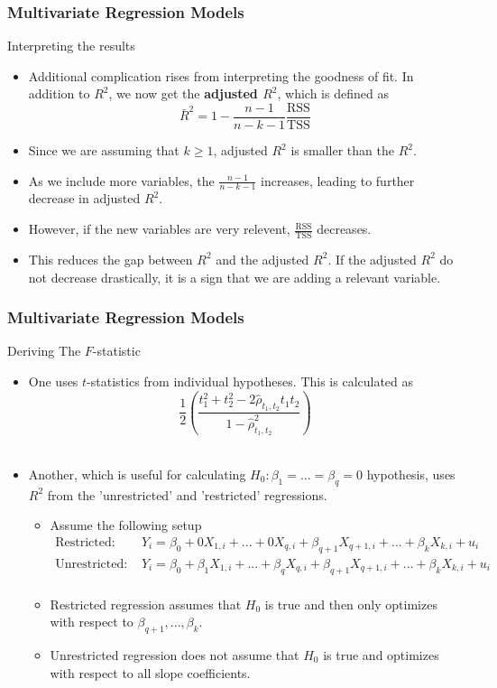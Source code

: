 \documentclass[compress]{beamer}
\begin{document}
\begin{frame}
\frametitle{Multivariate Regression Models}
Interpreting the results
\begin{itemize}
 \item Additional complication rises from interpreting the goodness of fit. In addition to $R^2$, we now get the \textbf{adjusted $R^2$}, which is defined as
\[
\bar{R}^2 = 1-\frac{n-1}{n-k-1}\frac{\text{RSS}}{\text{TSS}}
\]
\item Since we are assuming that $k\geq 1$, adjusted $R^2$ is smaller than the $R^2$. 
\item As we include more variables, the $\frac{n-1}{n-k-1}$ increases, leading to further decrease in adjusted $R^2$. \item However, if the new variables are very relevent, $\frac{\text{RSS}}{\text{TSS}}$ decreases. 
\item This reduces the gap between $R^2$ and the adjusted $R^2$. If the adjusted $R^2$ do not decrease drastically, it is a sign that we are adding a relevant variable. \par\medskip
\end{itemize}
\end{frame}


\begin{frame}
\frametitle{Multivariate Regression Models}
Deriving The $F$-statistic
\begin{itemize}
 \item One uses $t$-statistics from individual hypotheses. This is calculated as
\[
\frac{1}{2}\left(\frac{t_1^2+t_2^2-2\hat{\rho}_{t_1,t_2}t_1t_2}{1-\hat{\rho}^2_{t_1,t_2}}\right)
\]\
\item Another, which is useful for calculating $H_0: \beta_1 = ... =\beta_q=0$ hypothesis, uses $R^2$ from the 'unrestricted' and 'restricted' regressions.
\begin{itemize}
\item Assume the following setup
\footnotesize{\[\begin{aligned}
\text{Restricted: } & Y_i =\beta_0+ 0X_{1,i} + ...+ 0X_{q,i}+ \beta_{q+1}X_{q+1,i}+...+\beta_kX_{k,i} + u_i\\
\text{Unrestricted: } & Y_i = \beta_0+\beta_1X_{1,i} + ... +\beta_qX_{q,i}+ \beta_{q+1}X_{q+1,i}+...+\beta_kX_{k,i} + u_i\\
\end{aligned}\]}\normalsize
\item Restricted regression assumes that $H_0$ is true and then only optimizes with respect to $\beta_{q+1},...,\beta_{k}$.
\item Unrestricted regression does not assume that $H_0$ is true and optimizes with respect to all slope coefficients.
\end{itemize}
\end{itemize}
\end{frame}
\end{document}
